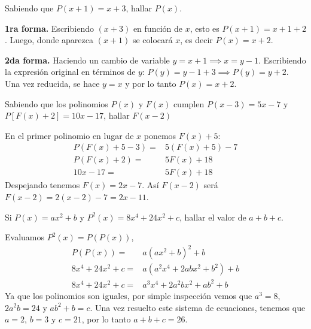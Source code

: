 \begin{example}
    Sabiendo que $P(x + 1) = x + 3$, hallar $P(x)$.
\end{example}
\begin{solution}
    \textbf{1ra forma.} Escribiendo $(x + 3)$ en función de $x$, esto es $P(x + 1) = x + 1 + 2$.
    Luego, donde aparezca $(x + 1)$ se colocará $x$, es decir $P(x) = x + 2$.

    \textbf{2da forma.} Haciendo un cambio de variable $y = x + 1 \implies x = y - 1$.
    Escribiendo la expresión original en términos de $y$: $P(y) = y - 1 + 3 \implies P(y) = y + 2$.
    Una vez reducida, se hace $y = x$ y por lo tanto $P(x) = x + 2$.
\end{solution}

\begin{example}
    Sabiendo que los polinomios $P(x)$ y $F(x)$ cumplen $P(x - 3) = 5x - 7$ y $P[F(x) + 2] = 10x - 17$, hallar $F(x - 2)$
\end{example}
\begin{solution}
    En el primer polinomio en lugar de $x$ ponemos $F(x) + 5$:
    \begin{align*}
        P(F(x) + 5 - 3) =&  5 (F(x) + 5) - 7\\
        P(F(x) + 2) =& 5F(x) + 18\\
        10x - 17 =& 5F(x) + 18
    \end{align*}
    Despejando tenemos $F(x) = 2x - 7$.
    Así $F(x - 2)$ será $F(x - 2) = 2(x - 2) - 7 = \boxed{2x - 11}$.
\end{solution}

\begin{example}
    Si $P(x) = ax^2 + b$ y $P^2(x) = 8x^4 + 24x^2 + c$, hallar el valor de $a + b + c$.
\end{example}
\begin{solution}
    Evaluamos $P^2(x) = P(P(x))$,
    \begin{align*}
        P(P(x)) =& a (ax^2 + b)^2 + b\\
        8x^4 + 24x^2 + c =& a (a^2 x^4 + 2abx^2 + b^2) + b\\
        8x^4 + 24x^2 + c =& a^3 x^4 + 2a^2 bx^2 + ab^2 + b
    \end{align*}
    Ya que los polinomios son iguales, por simple inspección vemos que $a^3 = 8$, $2a^2 b = 24$ y $ab^2 + b = c$.
    Una vez resuelto este sistema de ecuaciones, tenemos que $a = 2$, $b = 3$ y $c = 21$, por lo tanto $a + b + c = 26$.
\end{solution}

